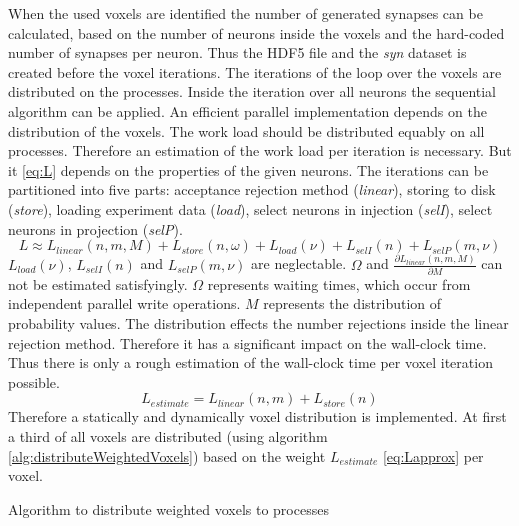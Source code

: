 When the used voxels are identified the number of generated synapses can be calculated, based on the
number of neurons inside the voxels and the hard-coded number of synapses per neuron.
Thus the HDF5 file and the \emph{syn} dataset is created before the voxel iterations.
The iterations of the loop over the voxels are distributed on the processes.
Inside the iteration over all neurons the sequential algorithm can be applied.
An efficient parallel implementation depends on the distribution of the voxels.
The work load should be distributed equably on all processes.
Therefore an estimation of the work load per iteration is necessary.
But it \ref{eq:L} depends on the properties of the given neurons.
The iterations can be partitioned into five parts: acceptance rejection method (\emph{linear}), storing to disk (\emph{store}),
loading experiment data (\emph{load}), select neurons in injection (\emph{selI}), select neurons in projection (\emph{selP}).
\begin{equation} \label{eq:L}
	L \approx L_{linear}(n,m,M) + L_{store}(n,\omega) + L_{load}(\nu) + L_{selI}(n) + L_{selP}(m,\nu)
\end{equation}
$L_{load}(\nu)$, $L_{selI}(n)$ and $L_{selP}(m,\nu)$ are neglectable.
$\Omega$ and $\frac{\partial L_{linear}(n,m,M)}{\partial M}$  can not be estimated satisfyingly.
$\Omega$ represents waiting times, which occur from independent parallel write operations.
$M$ represents the distribution of probability values.
The distribution effects the number rejections inside the linear rejection method.
Therefore it has a significant impact on the wall-clock time.
Thus there is only a rough estimation of the wall-clock time per voxel iteration possible.
\begin{equation} \label{eq:Lapprox}
	L_{estimate} = L_{linear}(n,m) + L_{store}(n)
\end{equation}
Therefore a statically and dynamically voxel distribution is implemented.
At first a third of all voxels are distributed (using algorithm \ref{alg:distributeWeightedVoxels}) based on the weight $L_{estimate}$ \ref{eq:Lapprox}  per voxel.
\begin{algorithm}[ht!]
\caption{Algorithm to distribute weighted voxels to processes}
\label{alg:distributeWeightedVoxels}
\end{algorithm}
